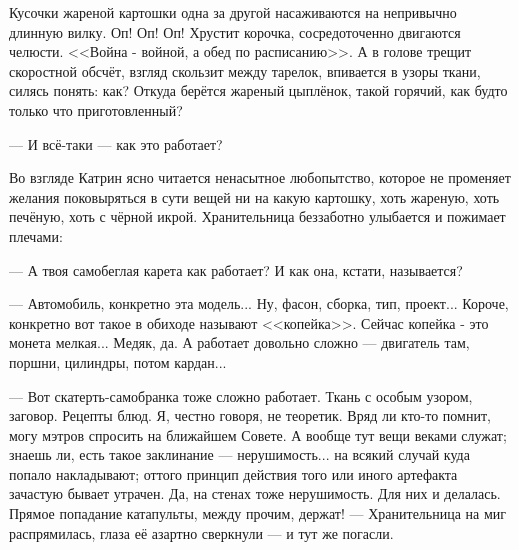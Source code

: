 Кусочки жареной картошки одна за другой насаживаются на непривычно длинную вилку. Оп! Оп! Оп!
Хрустит корочка, сосредоточенно двигаются челюсти. <<Война - войной, а обед по расписанию>>.
А в голове трещит скоростной обсчёт, взгляд скользит между тарелок, впивается в узоры ткани, силясь понять: как?
Откуда берётся жареный цыплёнок, такой горячий, как будто только что приготовленный?

--- И всё-таки --- как это работает?

Во взгляде Катрин ясно читается ненасытное любопытство, которое не променяет желания поковыряться в сути вещей
ни на какую картошку, хоть жареную, хоть печёную, хоть с чёрной икрой. Хранительница беззаботно улыбается и пожимает плечами:

--- А твоя самобеглая карета как работает? И как она, кстати, называется?

--- Автомобиль, конкретно эта модель... Ну, фасон, сборка, тип, проект...
Короче, конкретно вот такое в обиходе называют <<копейка>>. Сейчас копейка - это монета мелкая... Медяк, да.
А работает довольно сложно --- двигатель там, поршни, цилиндры, потом кардан...

--- Вот скатерть-самобранка тоже сложно работает. Ткань с особым узором, заговор. Рецепты блюд.
Я, честно говоря, не теоретик. Вряд ли кто-то помнит, могу мэтров спросить на ближайшем Совете.
А вообще тут вещи веками служат; знаешь ли, есть такое заклинание --- нерушимость... на всякий случай куда попало накладывают;
оттого принцип действия того или иного артефакта зачастую бывает утрачен. Да, на стенах тоже нерушимость. Для них и делалась.
Прямое попадание катапульты, между прочим, держат! --- Хранительница на миг распрямилась,
глаза её азартно сверкнули --- и тут же погасли.

